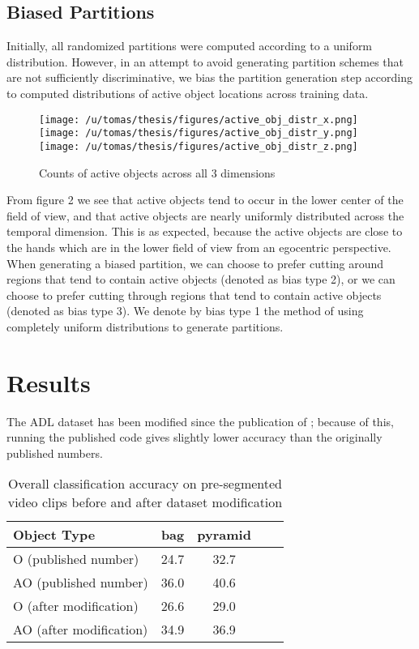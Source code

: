 \documentclass[10pt,twocolumn,letterpaper]{article}
\begin{document}
\subsection{Biased Partitions}
	Initially, all randomized partitions were computed according to a uniform
	distribution. However, in an attempt to avoid generating partition schemes
	that are not sufficiently discriminative, we bias the partition generation
	step according to computed distributions of active object locations across
	training data. 

	\begin{figure}[t]
		\begin{center}
			  \texttt{[image: /u/tomas/thesis/figures/active\_obj\_distr\_x.png]}
			  \texttt{[image: /u/tomas/thesis/figures/active\_obj\_distr\_y.png]}
			  \texttt{[image: /u/tomas/thesis/figures/active\_obj\_distr\_z.png]}
		\end{center}
		   \caption{Counts of active objects across all 3 dimensions}
				\label{fig:long}
				\label{fig:onecol}
	\end{figure}
	
	From figure 2 we see that active objects tend to occur in the lower center
	of the field of view, and that active objects are nearly uniformly
	distributed across the temporal dimension. This is as expected, because
	the active objects are close to the hands which are in the lower field of
	view from an egocentric perspective. When generating a biased
	partition, we can choose to prefer cutting around regions that tend to
	contain active objects (denoted as bias type 2), or we can choose to prefer 
	cutting through regions that tend to contain active objects (denoted as bias type 3). 
	We denote by bias type 1 the method of using completely uniform
	distributions to generate partitions.
\section{Results}
	The ADL dataset has been modified since the publication of
	\cite{Ramanan12}; because of this, running the published code gives
	slightly lower accuracy than the originally published numbers.

	
	\begin{table}
		\begin{center}
			\begin{tabular}{|l|c|c|c|c|}
				\hline
				Object Type & bag & pyramid  \\
				\hline\hline
				O (published number) & 24.7 & 32.7 \\
			 AO (published number) & 36.0 & 40.6 \\
				\hline\hline
				O (after modification) & 26.6 & 29.0 \\
 				AO (after modification) & 34.9 & 36.9 \\
				\hline
			\end{tabular}
		\end{center}
		\caption{Overall classification accuracy on pre-segmented video clips before and after dataset
		modification}
	\end{table}
	
\end{document}
